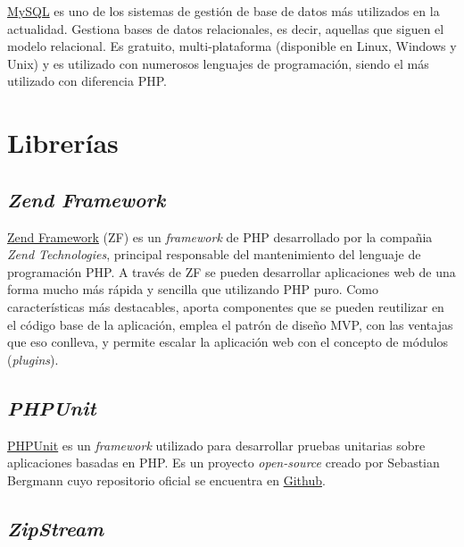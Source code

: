 \documentclass[
]{article}
\begin{document}
\href{https://www.mysql.com/}{MySQL} es uno de los sistemas de gestión
de base de datos más utilizados en la actualidad. Gestiona bases de
datos relacionales, es decir, aquellas que siguen el modelo relacional.
Es gratuito, multi-plataforma (disponible en Linux, Windows y Unix) y es
utilizado con numerosos lenguajes de programación, siendo el más
utilizado con diferencia PHP.

\hypertarget{libreruxedas}{%
\section{Librerías}\label{libreruxedas}}

\hypertarget{zend-framework}{%
\subsection{\texorpdfstring{\emph{Zend
Framework}}{Zend Framework}}\label{zend-framework}}

\href{https://framework.zend.com/}{Zend Framework} (ZF) es un
\emph{framework} de PHP desarrollado por la compañia \emph{Zend
Technologies}, principal responsable del mantenimiento del lenguaje de
programación PHP. A través de ZF se pueden desarrollar aplicaciones web
de una forma mucho más rápida y sencilla que utilizando PHP puro. Como
características más destacables, aporta componentes que se pueden
reutilizar en el código base de la aplicación, emplea el patrón de
diseño MVP, con las ventajas que eso conlleva, y permite escalar la
aplicación web con el concepto de módulos (\emph{plugins}).

\hypertarget{phpunit}{%
\subsection{\texorpdfstring{\emph{PHPUnit}}{PHPUnit}}\label{phpunit}}

\href{https://phpunit.de/}{PHPUnit} es un \emph{framework} utilizado
para desarrollar pruebas unitarias sobre aplicaciones basadas en PHP. Es
un proyecto \emph{open-source} creado por Sebastian Bergmann cuyo
repositorio oficial se encuentra en
\href{https://github.com/sebastianbergmann/phpunit}{Github}.

\hypertarget{zipstream}{%
\subsection{\texorpdfstring{\emph{ZipStream}}{ZipStream}}\label{zipstream}}
\end{document}
